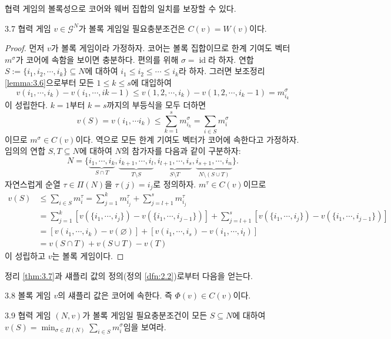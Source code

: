 \documentclass{article}
\numberwithin{equation}{section}
\begin{document}
협력 게임의 볼록성으로 코어와 웨버 집합의 일치를 보장할 수 있다.

\begin{thm}{}{3.7}
	협력 게임 $v\in\mathcal G^N$가 볼록 게임일 필요충분조건은 $C(v)=W(v)$이다.
\end{thm}

\begin{proof}
	먼저 $v$가 볼록 게임이라 가정하자. 코어는 볼록 집합이므로 한계 기여도 벡터 $m^\sigma$가 코어에 속함을 보이면 충분하다. 편의를 위해 $\sigma=\operatorname{id}$라 하자. 연합 $S:=\{i_1,i_2,\cdots,i_k\}\subseteq N$에 대하여 $i_1\leq i_2\leq\cdots\leq i_k$라 하자. 그러면 보조정리 \ref{lemma:3.6}으로부터 모든 $1\leq k\leq s$에 대입하여
	\[
		v(i_1,\cdots,i_k)-v(i_1,\cdots,i{k-1})\leq v(1,2,\cdots,i_k)-v(1,2,\cdots,i_k-1)=m_{i_k}^\sigma
	\]
	이 성립한다. $k=1$부터 $k=s$까지의 부등식을 모두 더하면
	\[
		v(S)=v(i_1,\cdots i_k)\leq\sum_{k=1}^sm_{i_k}^\sigma=\sum_{i\in S}m_i^\sigma
	\]
	이므로 $m^\sigma\in C(v)$이다. 역으로 모든 한계 기여도 벡터가 코어에 속한다고 가정하자. 임의의 연합 $S,T\subseteq N$에 대하여 $N$의 참가자를 다음과 같이 구분하자:
	\[
		N=\{\underbrace{i_1,\cdots,i_k}_{S\cap T},\underbrace{i_{k+1},\cdots,i_l}_{T\setminus S},\underbrace{i_{l+1},\cdots,i_s}_{S\setminus T},\underbrace{i_{s+1},\cdots,i_n}_{N\setminus(S\cup T)}\}.
	\]
	자연스럽게 순열 $\tau\in\Pi(N)$을 $\tau(j)=i_j$로 정의하자. $m^\tau\in C(v)$이므로
	\[
		\begin{aligned}
			v(S)&\leq\sum_{i\in S}m_i^\tau=\sum_{j=1}^km_{i_j}^\tau+\sum_{j=l+1}^sm_{i_j}^\tau\\
			&=\sum_{j=1}^k[v(\{i_1,\cdots,i_j\})-v(\{i_1,\cdots,i_{j-1}\})]+\sum_{j=l+1}^s[v(\{i_1,\cdots,i_j\})-v(\{i_1,\cdots,i_{j-1}\})]\\
			&=[v(i_1,\cdots,i_k)-v(\varnothing)]+[v(i_1,\cdots,i_s)-v(i_1,\cdots,i_l)]\\
			&=v(S\cap T)+v(S\cup T)-v(T)
		\end{aligned}
	\]
	이 성립하고 $v$는 볼록 게임이다.
\end{proof}

정리 \ref{thm:3.7}과 섀플리 값의 정의(정의 \ref{dfn:2.2})로부터 다음을 얻는다.

\begin{cor}{}{3.8}
	볼록 게임 $v$의 섀플리 값은 코어에 속한다. 즉 $\Phi(v)\in C(v)$이다.
\end{cor}

\begin{prob}{}{3.9}
	협력 게임 $(N,v)$가 볼록 게임일 필요충분조건이 모든 $S\subseteq N$에 대하여 $v(S)=\min_{\sigma\in\Pi(N)}\sum_{i\in S}m_i^\sigma$임을 보여라.
\end{prob}
\end{document}
